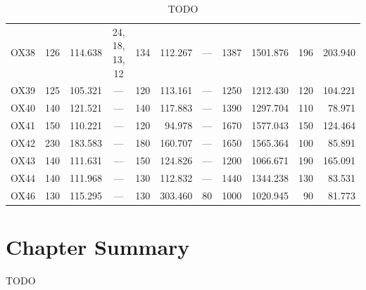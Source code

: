 \begin{landscape}
\begin{table}[p]
\begin{center}
\begin{tabular}{c|rrc|rrc|rr|rr}
OX38 & 126 & 114.638 & 24, 18, 13, 12 & 134 & 112.267 &                            --- & 1387 & 1501.876 & 196 & 203.940 \\
OX39 & 125 & 105.321 &            --- & 120 & 113.161 &                            --- & 1250 & 1212.430 & 120 & 104.221 \\
OX40 & 140 & 121.521 &            --- & 140 & 117.883 &                            --- & 1390 & 1297.704 & 110 &  78.971 \\
OX41 & 150 & 110.221 &            --- & 120 &  94.978 &                            --- & 1670 & 1577.043 & 150 & 124.464 \\
OX42 & 230 & 183.583 &            --- & 180 & 160.707 &                            --- & 1650 & 1565.364 & 100 &  85.891 \\
OX43 & 140 & 111.631 &            --- & 150 & 124.826 &                            --- & 1200 & 1066.671 & 190 & 165.091 \\
OX44 & 140 & 111.968 &            --- & 130 & 112.832 &                            --- & 1440 & 1344.238 & 130 &  83.531 \\
OX46 & 130 & 115.295 &            --- & 130 & 303.460 &                             80 & 1000 & 1020.945 &  90 &  81.773
\end{tabular}
\end{center}
\caption{TODO}
\label{tbl:validation-volcalc}
\end{table}
\end{landscape}





\clearpage
\newpage

\section{Chapter Summary}

TODO
